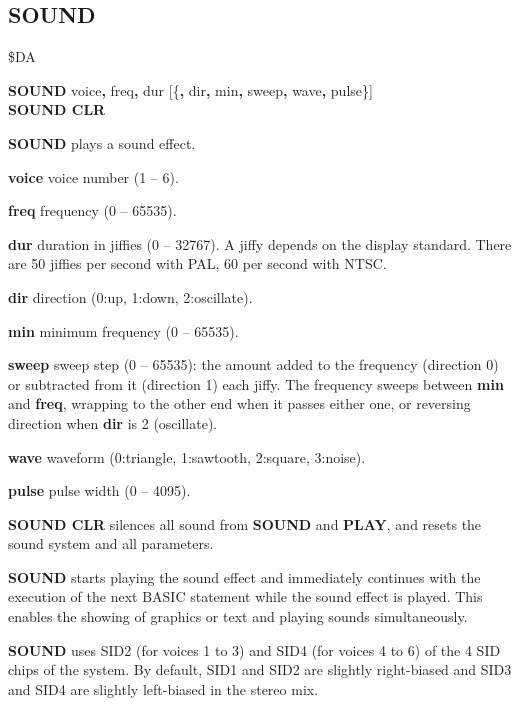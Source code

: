 \subsection{SOUND}
\begin{description}[leftmargin=2cm,style=nextline]
\item [Token:]    \$DA

\item [Format:]   {\bf SOUND} voice{\bf,} freq{\bf,} dur [\{{\bf,} dir{\bf,} min{\bf,} sweep{\bf,} wave{\bf,} pulse\}] \\
                  {\bf SOUND CLR}

\item [Usage:]    {\bf SOUND} plays a sound effect.

                  {\bf voice} voice number (1 -- 6).

                  {\bf freq} frequency (0 -- 65535).

                  {\bf dur} duration in jiffies (0 -- 32767). A jiffy depends on the display standard. There are 50 jiffies per second with PAL, 60 per second with NTSC.

                  {\bf dir} direction (0:up, 1:down, 2:oscillate).

                  {\bf min} minimum frequency (0 -- 65535).

                  {\bf sweep} sweep step (0 -- 65535): the amount added to the frequency (direction 0) or subtracted from it (direction 1) each jiffy. The frequency sweeps between {\bf min} and {\bf freq}, wrapping to the other end when it passes either one, or reversing direction when {\bf dir} is 2 (oscillate).

                  {\bf wave} waveform (0:triangle, 1:sawtooth, 2:square, 3:noise).

                  {\bf pulse} pulse width (0 -- 4095).

                  {\bf SOUND CLR} silences all sound from {\bf SOUND} and {\bf PLAY}, and resets the sound system and all parameters.

\item [Remarks:]  {\bf SOUND} starts playing the sound effect and immediately continues with the execution of the next BASIC statement while the sound effect is played. This enables the showing of graphics or text and playing sounds simultaneously.

                  {\bf SOUND} uses SID2 (for voices 1 to 3) and SID4 (for voices 4 to 6) of the 4 SID chips of the system. By default, SID1 and SID2 are slightly right-biased and SID3 and SID4 are slightly left-biased in the stereo mix.


\end{description}

